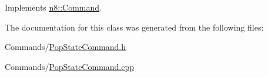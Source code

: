 Implements \hyperlink{classn8_1_1_command_a8a70ef93c997ef2f545154e1c55cdf87}{n8\-::\-Command}.



The documentation for this class was generated from the following files\-:\begin{DoxyCompactItemize}
\item 
Commands/\hyperlink{_pop_state_command_8h}{Pop\-State\-Command.\-h}\item 
Commands/\hyperlink{_pop_state_command_8cpp}{Pop\-State\-Command.\-cpp}\end{DoxyCompactItemize}
